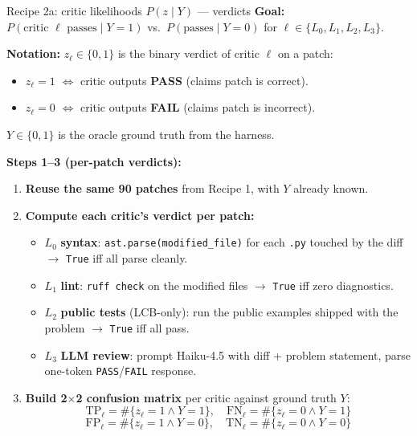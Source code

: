 \documentclass[10pt]{beamer}
\newcommand{\good}[1]{\textcolor{accentGreen}{\textbf{#1}}}
\newcommand{\bad}[1]{\textcolor{accentRed}{\textbf{#1}}}
\newcommand{\info}[1]{\textcolor{primaryBlue}{\textbf{#1}}}
\begin{document}
\begin{frame}{Recipe 2a: critic likelihoods \textcolor{accentGreen}{$P(z\mid Y)$} --- verdicts}
\vspace{0.15cm}
\textbf{Goal:} $P(\text{critic } \ell \text{ passes} \mid Y{=}1)$ vs.\
$P(\text{passes} \mid Y{=}0)$ for $\ell \in \{L_0, L_1, L_2, L_3\}$.

\textbf{\textcolor{accentTeal}{Notation:}} $z_\ell \in \{0, 1\}$ is the binary
verdict of critic $\ell$ on a patch:
\begin{itemize}\setlength\itemsep{0pt}
\item $z_\ell = 1$ $\Leftrightarrow$ critic outputs \good{PASS} (claims patch
  is correct).
\item $z_\ell = 0$ $\Leftrightarrow$ critic outputs \bad{FAIL} (claims patch
  is incorrect).
\end{itemize}
$Y \in \{0, 1\}$ is the oracle ground truth from the harness.

\vspace{0.15cm}
\textbf{Steps 1--3 (per-patch verdicts):}
\begin{enumerate}
\item \info{Reuse the same 90 patches} from Recipe 1, with $Y$ already known.

\item \info{Compute each critic's verdict per patch:}
  \begin{itemize}
  \item $L_0$ \textbf{syntax}: \texttt{ast.parse(modified\_file)} for each
    \texttt{.py} touched by the diff $\to$ \texttt{True} iff all parse cleanly.
  \item $L_1$ \textbf{lint}: \texttt{ruff check} on the modified files
    $\to$ \texttt{True} iff zero diagnostics.
  \item $L_2$ \textbf{public tests} (LCB-only): run the public examples
    shipped with the problem $\to$ \texttt{True} iff all pass.
  \item $L_3$ \textbf{LLM review}: prompt Haiku-4.5 with diff + problem
    statement, parse one-token \texttt{PASS}/\texttt{FAIL} response.
  \end{itemize}

\item \info{Build 2$\times$2 confusion matrix} per critic against ground truth $Y$:
  \[
  \mathrm{TP}_\ell = \#\{z_\ell{=}1 \wedge Y{=}1\},\quad
  \mathrm{FN}_\ell = \#\{z_\ell{=}0 \wedge Y{=}1\}
  \]
  \[
  \mathrm{FP}_\ell = \#\{z_\ell{=}1 \wedge Y{=}0\},\quad
  \mathrm{TN}_\ell = \#\{z_\ell{=}0 \wedge Y{=}0\}
  \]
\end{enumerate}
\end{frame}
\end{document}
